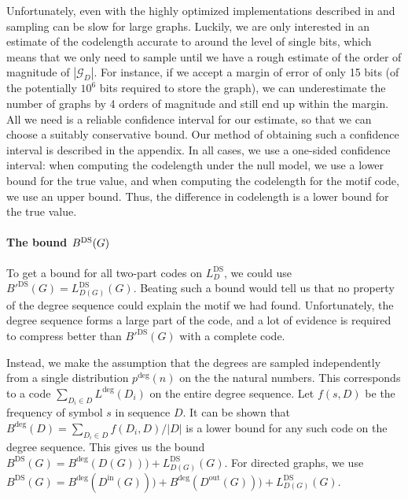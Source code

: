 \documentclass[twoside,11pt]{article}
\newcommand{\cG}{{\mathcal G}}
\begin{document}

Unfortunately, even with the highly optimized implementations described in \cite{charo2010efficient} and \cite{kim2012constructing} sampling can be slow for large graphs. Luckily, we are only interested in an estimate of the codelength accurate to around the level of single bits, which means that we only need to sample until we have a rough estimate of the order of magnitude of $|\cG_D|$. For instance, if we accept a margin of error of only 15 bits (of the potentially $10^6$ bits required to store the graph), we can underestimate the number of graphs by 4 orders of magnitude and still end up within the margin. All we need is a reliable confidence interval for our estimate, so that we can choose a suitably conservative bound. Our method of obtaining such a confidence interval is described in the appendix. In all cases, we use a one-sided confidence interval: when computing the codelength under the null model, we use a lower bound for the true value, and when computing the codelength for the motif code, we use an upper bound. Thus, the difference in codelength is a lower bound for the true value.

\paragraph{The bound $B^\textnormal{DS}(G)$} To get a bound for all two-part codes on $L^\text{DS}_D$, we could use ${B'}^\text{DS}(G) = L^\text{DS}_{D(G)}(G)$. Beating such a bound would tell us that no property of the degree sequence could explain the motif we had found. Unfortunately, the degree sequence forms a large part of the code, and a lot of evidence is required to compress better than ${B'}^\text{DS}(G)$ with a complete code. 

Instead, we make the assumption that the degrees are sampled independently from a single distribution $p^\text{deg}(n)$ on the the natural numbers. This corresponds to a code $\sum_{D_i \in D}L^\text{deg}(D_i)$ on the entire degree sequence. Let $f(s, D)$ be the frequency of symbol $s$ in sequence $D$. It can be shown that $B^\text{deg}(D) = \sum_{D_i \in D} f(D_i, D)/|D|$ is a lower bound for any such code on the degree sequence. This gives us the bound $B^\text{DS}(G) = B^\text{deg}(D(G))) + L^\text{DS}_{D(G)}(G)$. For directed graphs, we use $B^\text{DS}(G) = B^\text{deg}(D^\text{in}(G))) + B^\text{deg}(D^\text{out}(G))) + L^\text{DS}_{D(G)}(G)$.
\end{document}
